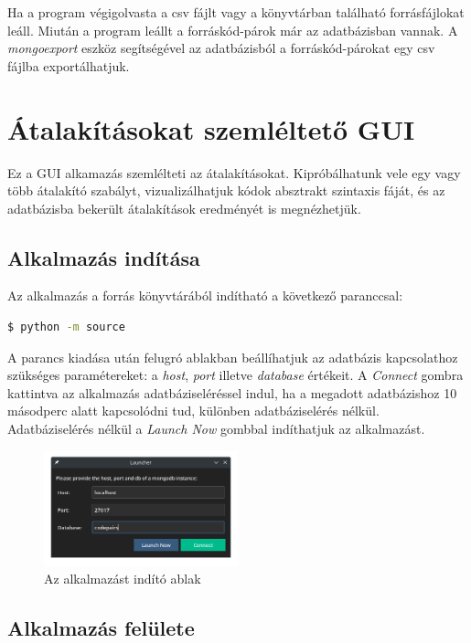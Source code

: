 Ha a program végigolvasta a csv fájlt vagy a könyvtárban található forrásfájlokat leáll.
Miután a program leállt a forráskód-párok már az adatbázisban vannak.
A \emph{mongoexport} eszköz segítségével
az adatbázisból a forráskód-párokat egy csv fájlba exportálhatjuk.

\section{Átalakításokat szemléltető GUI}

Ez a GUI alkamazás szemlélteti az átalakításokat.
Kipróbálhatunk vele egy vagy több átalakító szabályt, vizualizálhatjuk kódok absztrakt szintaxis fáját,
és az adatbázisba bekerült átalakítások eredményét is megnézhetjük.

\subsection{Alkalmazás indítása}

Az alkalmazás a forrás könyvtárából indítható a következő paranccsal:

\begin{lstlisting}[language=bash]
	$ python -m source
\end{lstlisting}

A parancs kiadása után felugró ablakban beállíhatjuk az adatbázis kapcsolathoz szükséges paramétereket:
a \emph{host}, \emph{port} illetve \emph{database} értékeit.
A \emph{Connect} gombra kattintva az alkalmazás adatbáziseléréssel indul,
ha a megadott adatbázishoz 10 másodperc alatt kapcsolódni tud, különben adatbáziselérés nélkül.
Adatbáziselérés nélkül a \emph{Launch Now} gombbal indíthatjuk az alkalmazást.

\begin{figure}[H]
	\centering
	\includegraphics[width=0.5\textwidth]{images/screenshots/launcher.png}
	\caption{Az alkalmazást indító ablak}
\end{figure}

\subsection{Alkalmazás felülete}

